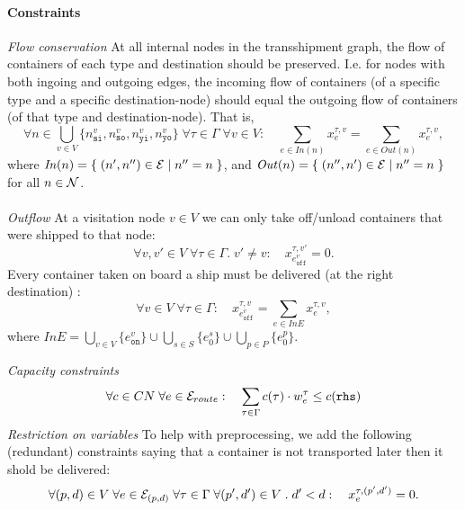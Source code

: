\paragraph{Constraints}$\;$\\
\textit{Flow conservation} 
At all internal nodes in the transshipment graph, the flow of containers of each type and destination should be preserved. I.e. for nodes with both ingoing and outgoing edges,  the incoming flow of containers (of a specific type and a specific destination-node) should equal the outgoing flow of containers (of that type and destination-node). That is, 
\[
\forall {n}\in \bigcup_{v\in V}\{n^v_{\texttt{si}}, n^v_\texttt{so}, n^v_\texttt{yi}, n^v_\texttt{yo}\}\; \forall \tau \in \Gamma\; \forall v \in V: 
\quad \sum_{e\in \mathit{In}(n)}x^{\tau, v}_e = \sum_{e\in \mathit{Out}(n)}x^{\tau, v}_e,
\]
where $\mathit{In}(n) = \{\;{(n',n'')\in\mathcal{E}}\;|\;{n'' = n}\;\}$, and $\mathit{Out}(n) = \{\;{(n'',n')\in \mathcal{E}}\;|\;{n'' = n}\;\}$ for all ${n}\in \mathcal{N}$.
\\\\
\textit{Outflow}
At a visitation node $v\in V$ we can only take off/unload containers that were shipped to that node:
\[
\forall v,v'\in V\;\forall \tau \in \Gamma.\;v'\neq v:\quad 
x^{\tau,v'}_{e^{v}_\texttt{off}} = 0.
\]
%
Every container taken on board a ship must be delivered (at the right destination) :
\[
\forall v\in V\;\forall\tau\in\Gamma:\quad
x^{\tau,v}_{e^{v}_{\texttt{off}}} = \sum_{e\in \mathit{InE}}x^{\tau,v}_e,
\]
where $\mathit{InE} = \bigcup_{v\in V}\{e^v_{\texttt{on}}\}\cup\bigcup_{s\in S}\{e^s_{0}\}\cup\bigcup_{p\in P}\{e^p_{0}\}$. 

\textit{Capacity constraints}
\[
\forall c\in CN\;\forall e\in \mathcal{E}_{route}:\quad
        \sum_{\tau \in \Gamma} c(\tau)\cdot w^\tau_e \leq c(\texttt{rhs})
\]
\textit{Restriction on variables}
To help with preprocessing, we add the following (redundant) constraints saying that a container is not transported later then it shold be delivered:
\[
\forall (p,d) \in V\; \forall e\in\mathcal{E}_{(p,d)}\;\forall \tau\in\Gamma\;\forall(p',d')\in V\;.\; d'< d :\quad x^{\tau, (p',d')}_{e} = 0.
\]

